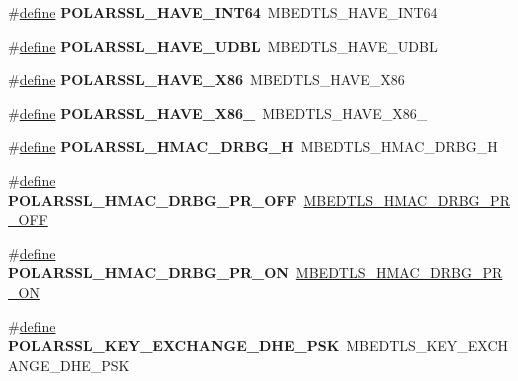 \begin{DoxyCompactItemize}
\#\hyperlink{structdefine}{define} {\bfseries P\+O\+L\+A\+R\+S\+S\+L\+\_\+\+H\+A\+V\+E\+\_\+\+I\+N\+T64}~M\+B\+E\+D\+T\+L\+S\+\_\+\+H\+A\+V\+E\+\_\+\+I\+N\+T64
\item 
\mbox{\label{compat-1_83_8h_a4f497e14fe66e1d321e4edb73126908b}} 
\#\hyperlink{structdefine}{define} {\bfseries P\+O\+L\+A\+R\+S\+S\+L\+\_\+\+H\+A\+V\+E\+\_\+\+U\+D\+BL}~M\+B\+E\+D\+T\+L\+S\+\_\+\+H\+A\+V\+E\+\_\+\+U\+D\+BL
\item 
\mbox{\label{compat-1_83_8h_acf30fb0de425e04a16d976a9346fa496}} 
\#\hyperlink{structdefine}{define} {\bfseries P\+O\+L\+A\+R\+S\+S\+L\+\_\+\+H\+A\+V\+E\+\_\+\+X86}~M\+B\+E\+D\+T\+L\+S\+\_\+\+H\+A\+V\+E\+\_\+\+X86
\item 
\mbox{\label{compat-1_83_8h_ad29140299bc5440f18bbae5380dbc184}} 
\#\hyperlink{structdefine}{define} {\bfseries P\+O\+L\+A\+R\+S\+S\+L\+\_\+\+H\+A\+V\+E\+\_\+\+X86\+\_}~M\+B\+E\+D\+T\+L\+S\+\_\+\+H\+A\+V\+E\+\_\+\+X86\+\_
\item 
\mbox{\label{compat-1_83_8h_aefeba0ff172b95c6a16b904cf566fd24}} 
\#\hyperlink{structdefine}{define} {\bfseries P\+O\+L\+A\+R\+S\+S\+L\+\_\+\+H\+M\+A\+C\+\_\+\+D\+R\+B\+G\+\_\+H}~M\+B\+E\+D\+T\+L\+S\+\_\+\+H\+M\+A\+C\+\_\+\+D\+R\+B\+G\+\_\+H
\item 
\mbox{\label{compat-1_83_8h_a1df2abd47fc8c24f9ce5c02c86337dad}} 
\#\hyperlink{structdefine}{define} {\bfseries P\+O\+L\+A\+R\+S\+S\+L\+\_\+\+H\+M\+A\+C\+\_\+\+D\+R\+B\+G\+\_\+\+P\+R\+\_\+\+O\+FF}~\hyperlink{hmac__drbg_8h_acbb59dffae4915b9a17142aaed752c57}{M\+B\+E\+D\+T\+L\+S\+\_\+\+H\+M\+A\+C\+\_\+\+D\+R\+B\+G\+\_\+\+P\+R\+\_\+\+O\+FF}
\item 
\mbox{\label{compat-1_83_8h_a48149f1fd6d91c46a1a4f1574cd65653}} 
\#\hyperlink{structdefine}{define} {\bfseries P\+O\+L\+A\+R\+S\+S\+L\+\_\+\+H\+M\+A\+C\+\_\+\+D\+R\+B\+G\+\_\+\+P\+R\+\_\+\+ON}~\hyperlink{hmac__drbg_8h_ac8c4bb0b84fb1c848cdb5fa240ef5e22}{M\+B\+E\+D\+T\+L\+S\+\_\+\+H\+M\+A\+C\+\_\+\+D\+R\+B\+G\+\_\+\+P\+R\+\_\+\+ON}
\item 
\mbox{\label{compat-1_83_8h_ae0a092dafdfbe4797aa47c996d6568c8}} 
\#\hyperlink{structdefine}{define} {\bfseries P\+O\+L\+A\+R\+S\+S\+L\+\_\+\+K\+E\+Y\+\_\+\+E\+X\+C\+H\+A\+N\+G\+E\+\_\+\+D\+H\+E\+\_\+\+P\+SK}~M\+B\+E\+D\+T\+L\+S\+\_\+\+K\+E\+Y\+\_\+\+E\+X\+C\+H\+A\+N\+G\+E\+\_\+\+D\+H\+E\+\_\+\+P\+SK

\end{DoxyCompactItemize}
